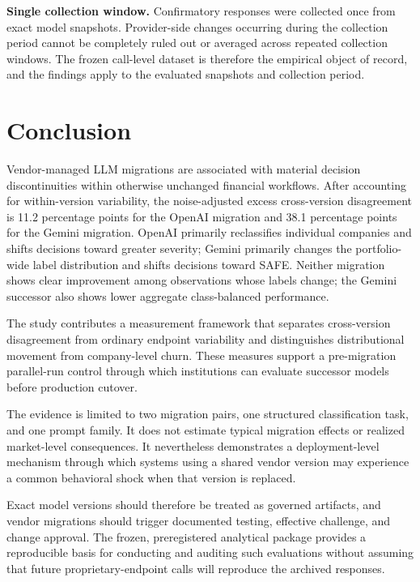 \documentclass[11pt]{article}
\begin{document}
\noindent\textbf{Single collection window.} Confirmatory responses were collected once from exact model snapshots. Provider-side changes occurring during the collection period cannot be completely ruled out or averaged across repeated collection windows. The frozen call-level dataset is therefore the empirical object of record, and the findings apply to the evaluated snapshots and collection period.

\section{Conclusion}
Vendor-managed LLM migrations are associated with material decision discontinuities within otherwise unchanged financial workflows. After accounting for within-version variability, the noise-adjusted excess cross-version disagreement is 11.2 percentage points for the OpenAI migration and 38.1 percentage points for the Gemini migration. OpenAI primarily reclassifies individual companies and shifts decisions toward greater severity; Gemini primarily changes the portfolio-wide label distribution and shifts decisions toward SAFE. Neither migration shows clear improvement among observations whose labels change; the Gemini successor also shows lower aggregate class-balanced performance.

The study contributes a measurement framework that separates cross-version disagreement from ordinary endpoint variability and distinguishes distributional movement from company-level churn. These measures support a pre-migration parallel-run control through which institutions can evaluate successor models before production cutover.

The evidence is limited to two migration pairs, one structured classification task, and one prompt family. It does not estimate typical migration effects or realized market-level consequences. It nevertheless demonstrates a deployment-level mechanism through which systems using a shared vendor version may experience a common behavioral shock when that version is replaced.

Exact model versions should therefore be treated as governed artifacts, and vendor migrations should trigger documented testing, effective challenge, and change approval. The frozen, preregistered analytical package provides a reproducible basis for conducting and auditing such evaluations without assuming that future proprietary-endpoint calls will reproduce the archived responses.
\end{document}
